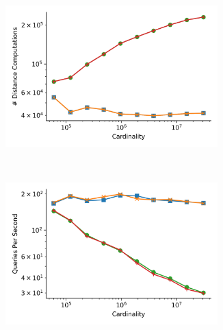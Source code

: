 \begin{figure}
\begin{subfigure}[b]{0.47\textwidth}
        \label{fig:results:sift-counts-throughput}
    \end{subfigure}%
    \begin{subfigure}[b]{0.47\textwidth}
        \includegraphics[width=0.9\textwidth]{images/distance_counts/fashion-mnist_KnnBreadthFirst_10_counts.png}
        \label{fig:results:random-counts-counts}
    \end{subfigure}%
    \\
    \begin{subfigure}[b]{0.47\textwidth}
        \includegraphics[width=0.9\textwidth]{images/distance_counts/fashion-mnist_KnnDepthFirst_10_throughput.png}
        \label{fig:results:silva-counts-throughput}
    \end{subfigure}%
    \begin{subfigure}[b]{0.47\textwidth}

\end{subfigure}
\end{figure}
